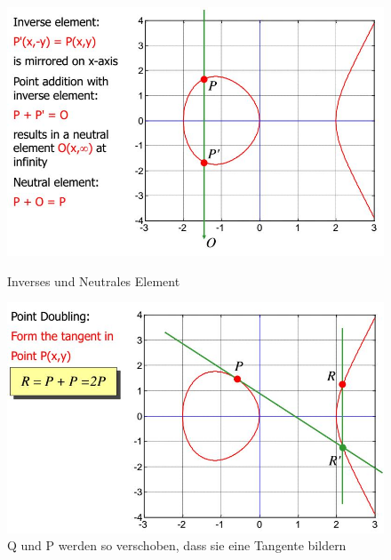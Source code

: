\begin{figure}[ht!]
	\centering
	\begin{minipage}[t]{0.4\textwidth}
		\centering
		\includegraphics[width=\linewidth]{images/eliptic_curve_calculation_neutral_inverse_elem}
		\caption{Inverses und Neutrales Element}
		\label{fig:elipticcurvecalculationneutralinverseelem}
	\end{minipage}
	\begin{minipage}[t]{0.4\textwidth}
		\centering
		\includegraphics[width=\linewidth]{images/eliptic_curve_calculation_point_doubling}
		\caption{Q und P werden so verschoben, dass sie eine Tangente bildern}
		\label{fig:elipticcurvecalculationpointdoubling}
	\end{minipage}
\end{figure}

